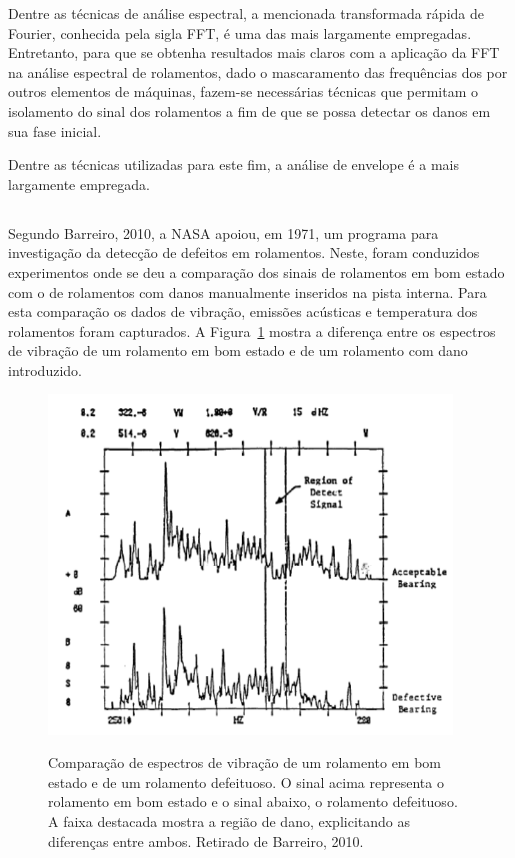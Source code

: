 \documentclass[
	12pt,				
	oneside,			
	a4paper,			
	english,			
	brazil,			
	]{abntex2ppgsi}
\begin{document}
Dentre as técnicas de análise espectral, a mencionada transformada rápida de Fourier, conhecida pela sigla FFT, é uma das mais largamente empregadas. Entretanto, para que se obtenha resultados mais claros com a aplicação da FFT na análise espectral de rolamentos, dado o mascaramento das frequências dos por outros elementos de máquinas, fazem-se necessárias técnicas que permitam o isolamento do sinal dos rolamentos a fim de que se possa detectar os danos em sua fase inicial. 

Dentre as técnicas utilizadas para este fim, a análise de envelope é a mais largamente empregada. 

\subsection{}

Segundo Barreiro, 2010, a NASA apoiou, em 1971, um programa para investigação da detecção de defeitos em rolamentos. Neste, foram conduzidos experimentos onde se deu a comparação dos sinais de rolamentos em bom estado com o de rolamentos com danos manualmente inseridos na pista interna. Para esta comparação os dados de vibração, emissões acústicas e temperatura dos rolamentos foram capturados. A Figura~\ref{fft_sinal_barreiro} mostra a diferença entre os espectros de vibração de um rolamento em bom estado e de um rolamento com dano introduzido.

\begin{figure}[H]
\centering
\caption {Comparação de espectros de vibração de um rolamento em bom estado e de um rolamento defeituoso. O sinal acima representa o rolamento em bom estado e o sinal abaixo, o rolamento defeituoso. A faixa destacada mostra a região de dano, explicitando as diferenças entre ambos. Retirado de Barreiro, 2010.}
\includegraphics[width=\textwidth,height=90mm,keepaspectratio]{fft_sinal_barreiro}
\label{fft_sinal_barreiro}
\end{figure}
\end{document}
